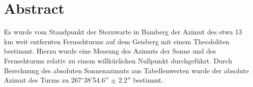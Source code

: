 \section{Abstract}
Es wurde vom Standpunkt der Sternwarte in Bamberg der Azimut des etwa 13 km weit entfernten Fernsehturms auf dem Geisberg mit einem Theodoliten bestimmt. Hierzu wurde eine Messung des Azimuts der Sonne und des Fernsehturms relativ zu einem willkürlichen Nullpunkt durchgeführt. Durch Berechnung des absoluten Sonnenazimuts aus Tabellenwerten wurde der absolute Azimut des Turms zu 267$^\circ$38$'$54.6$''$ $\pm$ 2.2$''$ bestimmt. 